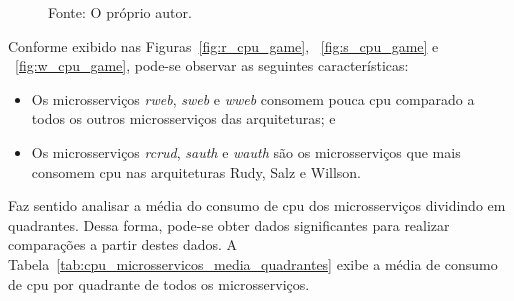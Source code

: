 \begin{figure}[htb!]
    Fonte: O próprio autor.
\end{figure}

Conforme exibido nas Figuras~\ref{fig:r_cpu_game}, ~\ref{fig:s_cpu_game} e ~\ref{fig:w_cpu_game}, pode-se observar as seguintes características:

\begin{itemize}
 \item Os microsserviços \textit{rweb}, \textit{sweb} e \textit{wweb} consomem pouca \ac{cpu} comparado a todos os outros microsserviços das arquiteturas; e
 \item Os microsserviços \textit{rcrud}, \textit{sauth} e \textit{wauth} são os microsserviços que mais consomem \ac{cpu} nas arquiteturas Rudy, Salz e Willson.
\end{itemize}

Faz sentido analisar a média do consumo de \ac{cpu} dos microsserviços dividindo em quadrantes.
%
Dessa forma, pode-se obter dados significantes para realizar comparações a partir destes dados.
%
A Tabela~\ref{tab:cpu_microsservicos_media_quadrantes} exibe a média de consumo de \ac{cpu} por quadrante de todos os microsserviços.


